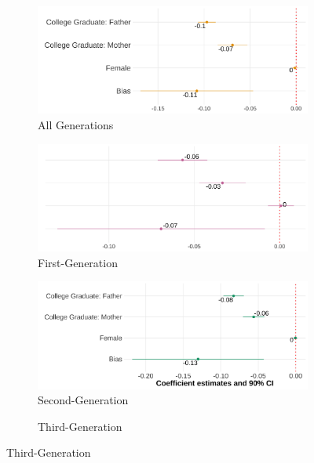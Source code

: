 \documentclass[12pt, fullpage]{article}
\begin{document}
\begin{center}
\begin{figure}[H]
\centering
\caption{Relationship Between Self-Reported Hispanic Identity and Bias: By Generation}
\label{plot01-regression-gen}
\begin{subfigure}{.48\textwidth}
\caption{All Generations}
\centering
\includegraphics[width=.9\linewidth]{figure/skin-iat-regression-all-gens.png}
\end{subfigure}
\centering
\begin{subfigure}{.48\textwidth}
\caption{First-Generation}
\centering
\includegraphics[width=.9\linewidth]{figure/skin-iat-regression-first-gen.png}
\end{subfigure}
\begin{subfigure}{.48\textwidth}
\caption{Second-Generation}
\centering
\includegraphics[width=.9\linewidth]{figure/skin-iat-regression-second-gen.png}
\end{subfigure}
\begin{subfigure}{.48\textwidth}
\caption{Third-Generation}

\end{subfigure}
\end{figure}
\end{center}
\end{document}
